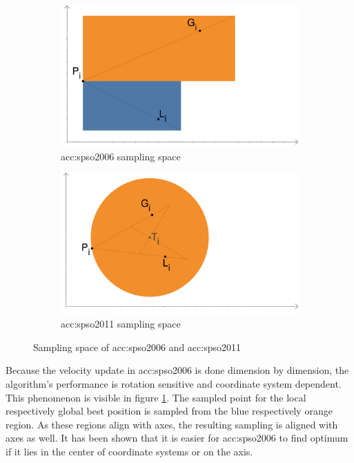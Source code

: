 \begin{figure}
    \begin{subfigure}[t]{0.45\textwidth}
        \includegraphics[width=\textwidth]{img/pso2006.pdf}
        \caption{\acrshort*{acc:spso2006} sampling space}
        \label{fig:samplingspso2006}
    \end{subfigure}
    \hfill
    \begin{subfigure}[t]{0.45\textwidth}
        \includegraphics[width=\textwidth]{img/pso2011.pdf}
        \caption{\acrshort*{acc:spso2011} sampling space}
        \label{fig:samplingspso2011}
    \end{subfigure}
    \caption{Sampling space of \acrshort*{acc:spso2006} and \acrshort*{acc:spso2011}}
\end{figure}

Because the velocity update in \acrshort{acc:spso2006} is done dimension by dimension, the algorithm's performance is rotation sensitive and coordinate system dependent. This phenomenon is visible in figure \ref{fig:samplingspso2006}. The sampled point for the local respectively global best position is sampled from the blue respectively orange region. As these regions align with axes, the resulting sampling is aligned with axes as well. It has been shown \citep{psobiasinzero} that it is easier for \acrshort{acc:spso2006} to find optimum if it lies in the center of coordinate systems or on the axis.

